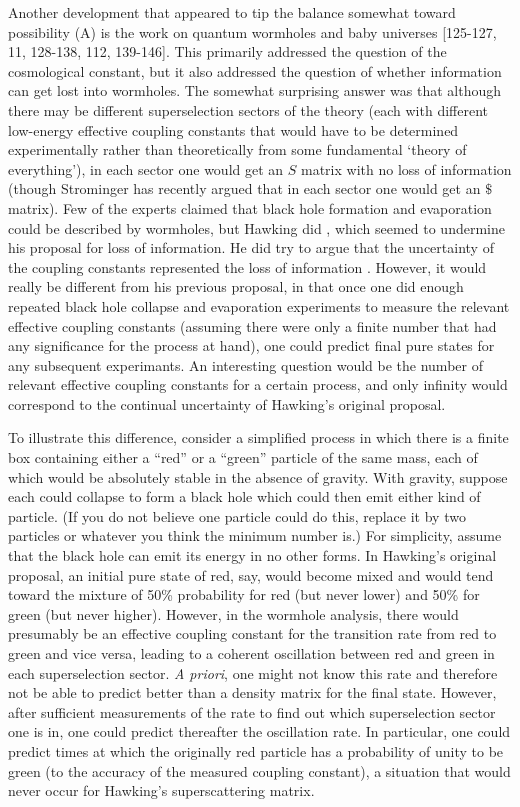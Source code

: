 \documentclass[12pt]{article}
\begin{document}
     Another development that appeared to tip the balance somewhat
toward
possibility (A) is the work on quantum wormholes and baby universes
[125-127, 11, 128-138, 112, 139-146].
This primarily addressed the question of the cosmological constant,
but it also
addressed the question of whether information can get lost into
wormholes.  The
somewhat surprising answer was that although there may be different
superselection sectors of the theory (each with different low-energy
effective
coupling constants that would have to be determined experimentally
rather than
theoretically from some fundamental `theory of everything'), in each
sector one
would get an $S$ matrix with no loss of information (though
Strominger has
recently argued \cite{Strom93}
that in each sector one would get an $\$$ matrix).  Few of the
experts claimed
that black hole formation and evaporation could be described by
wormholes, but
Hawking did \cite{w6}, which seemed to undermine his proposal for
loss of
information.  He did try to argue that the uncertainty of the
coupling
constants represented the loss of information \cite{w10,w15}.
However, it
would
really be different from his previous proposal, in that once one did
enough
repeated black hole collapse and evaporation experiments to measure
the
relevant effective coupling constants (assuming there were only a
finite number
that had any significance for the process at hand), one could predict
final
pure states for any subsequent experimants.  An interesting question
would be
the number of relevant effective coupling constants for a certain
process, and
only infinity would correspond to the continual uncertainty of
Hawking's
original proposal.

     To illustrate this difference, consider a simplified process in
which
there is a finite box containing either a ``red'' or a ``green''
particle of
the
same mass, each of which would be absolutely stable in the absence of
gravity.
With gravity, suppose each could collapse to form a black hole which
could then
emit either kind of particle.  (If you do not believe one particle
could do
this, replace it by two particles or whatever you think the minimum
number is.)
For simplicity, assume that the black hole can emit its energy in no
other
forms.
In Hawking's original proposal, an initial  pure state of red, say,
would
become mixed and would tend toward the mixture of 50\% probability
for red (but
never lower) and 50\% for green (but never higher).  However, in the
wormhole
analysis, there would presumably be an effective coupling constant
for the
transition rate from red to green and vice versa, leading to a
coherent
oscillation between red and green in each superselection sector.
{\it A
priori}, one might not know this rate and therefore not be able to
predict
better than a density matrix for the final state.  However, after
sufficient
measurements of the rate to find out which superselection sector one
is in, one
could predict thereafter the oscillation rate.  In particular, one
could
predict times at which the originally red particle has a probability
of unity
to be green (to the accuracy of the measured coupling constant), a
situation
that would never occur for Hawking's superscattering matrix.
\end{document}
